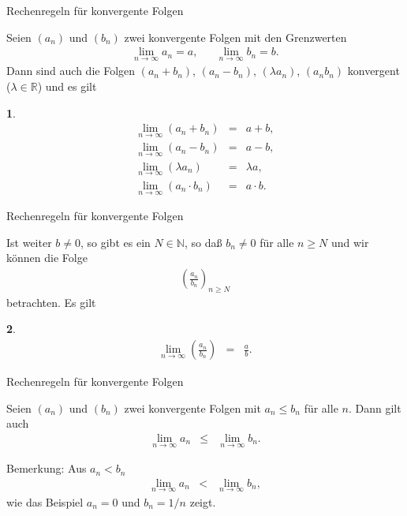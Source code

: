 \documentclass[german]{beamer}
\newcommand{\bq}{\begin{eqnarray*}}
\newcommand{\eq}{\end{eqnarray*}}
\newcommand{\superalert}[1]{{\color{MyYellowOrange}{#1}}}
\newtheorem*{myemptytheorem}{}
\begin{document}
\begin{frame}{Rechenregeln f\"ur konvergente Folgen}

Seien $(a_n)$ und $(b_n)$ zwei konvergente Folgen mit den Grenzwerten
\bq
 \lim\limits_{n \rightarrow \infty} a_n = a,
 & &
 \lim\limits_{n \rightarrow \infty} b_n = b.
\eq
Dann sind auch die Folgen $(a_n+b_n)$, $(a_n-b_n)$, $(\lambda a_n)$, $(a_n b_n)$ konvergent
($\lambda \in \mathbb R$)
und es gilt
\begin{myemptytheorem}
\bq
 \lim\limits_{n \rightarrow \infty} \left(a_n+b_n\right) & = & a + b,
\nonumber \\
 \lim\limits_{n \rightarrow \infty} \left(a_n-b_n\right) & = & a - b,
\nonumber \\
 \lim\limits_{n \rightarrow \infty} \left(\lambda a_n\right) & = & \lambda a,
\nonumber \\
 \lim\limits_{n \rightarrow \infty} \left(a_n\cdot b_n\right) & = & a \cdot b.
\eq
\end{myemptytheorem}

\end{frame}

\begin{frame}{Rechenregeln f\"ur konvergente Folgen}

Ist weiter $b \neq 0$, so gibt es ein $N \in \mathbb N$, so da{\ss} $b_n\neq 0$ f\"ur alle
$n\ge N$ und wir k\"onnen die Folge
\bq
 \left( \frac{a_n}{b_n} \right)_{n\ge N}
\eq
betrachten. Es gilt
\begin{myemptytheorem}
\bq
 \lim\limits_{n \rightarrow \infty} \left( \frac{a_n}{b_n} \right) & = & \frac{a}{b}.
\eq
\end{myemptytheorem}

\end{frame}

\begin{frame}{Rechenregeln f\"ur konvergente Folgen}

\begin{theorem}
Seien $(a_n)$ und $(b_n)$ zwei konvergente Folgen mit $a_n \le b_n$ f\"ur alle $n$.
Dann gilt auch
\bq
\lim\limits_{n \rightarrow \infty} a_n & \le & \lim\limits_{n \rightarrow \infty} b_n.
\eq
\end{theorem}

\vspace*{6mm}
\alert{Bemerkung}: Aus $a_n < b_n$ \superalert{folgt nicht} 
\bq
\lim\limits_{n \rightarrow \infty} a_n & < & \lim\limits_{n \rightarrow \infty} b_n,
\eq
wie das Beispiel
$a_n=0$ und $b_n=1/n$ zeigt.

\end{frame}
\end{document}
